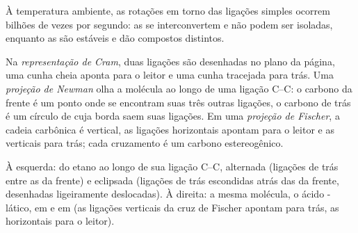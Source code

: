 À temperatura ambiente, as rotações em torno das ligações simples
ocorrem bilhões de vezes por segundo: as  se interconvertem
e não podem ser isoladas, enquanto as  são estáveis e dão
compostos distintos.

\begin{definition}[Representações]\label{def:b1:stereochemistry-in-depth:representations}
Na \emph{representação de Cram}, duas ligações
são desenhadas no plano da página, uma cunha cheia aponta para o leitor
e uma cunha tracejada para trás. Uma \emph{projeção de Newman}
olha a molécula ao longo de uma ligação C--C: o carbono da frente é um
ponto onde se encontram suas três outras ligações, o carbono de trás é
um círculo de cuja borda saem suas ligações. Em uma \emph{projeção de
Fischer}, a cadeia carbônica é vertical, as
ligações horizontais apontam para o leitor e as verticais para trás;
cada cruzamento é um carbono estereogênico.
\end{definition}

\begin{omfigure}

{\small À esquerda:  do etano ao longo de sua ligação
C--C, alternada (ligações de trás entre as da frente) e eclipsada
(ligações de trás escondidas atrás das da frente, desenhadas ligeiramente
deslocadas). À direita: a mesma molécula, o ácido -lático, em
 e em  (as ligações verticais da
cruz de Fischer apontam para trás, as horizontais para o leitor).}
\end{omfigure}

